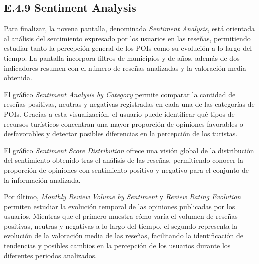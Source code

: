 
\subsection{E.4.9 Sentiment Analysis}

Para finalizar, la novena pantalla, denominada \textit{Sentiment Analysis}, está orientada al análisis del sentimiento expresado por los usuarios en las reseñas, permitiendo estudiar tanto la percepción general de los POIs como su evolución a lo largo del tiempo. La pantalla incorpora filtros de municipios y de años, además de dos indicadores resumen con el número de reseñas analizadas y la valoración media obtenida.

El gráfico \textit{Sentiment Analysis by Category} permite comparar la cantidad de reseñas positivas, neutras y negativas registradas en cada una de las categorías de POIs. Gracias a esta visualización, el usuario puede identificar qué tipos de recursos turísticos concentran una mayor proporción de opiniones favorables o desfavorables y detectar posibles diferencias en la percepción de los turistas.

El gráfico \textit{Sentiment Score Distribution} ofrece una visión global de la distribución del sentimiento obtenido tras el análisis de las reseñas, permitiendo conocer la proporción de opiniones con sentimiento positivo y negativo para el conjunto de la información analizada.

Por último, \textit{Monthly Review Volume by Sentiment} y \textit{Review Rating Evolution} permiten estudiar la evolución temporal de las opiniones publicadas por los usuarios. Mientras que el primero muestra cómo varía el volumen de reseñas positivas, neutras y negativas a lo largo del tiempo, el segundo representa la evolución de la valoración media de las reseñas, facilitando la identificación de tendencias y posibles cambios en la percepción de los usuarios durante los diferentes periodos analizados.

